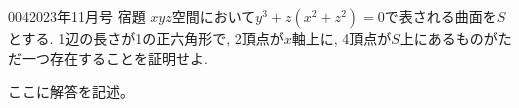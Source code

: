 \begin{prob}{004}{}{2023年11月号 宿題}
 $xyz$空間において$y^3 + z(x^2 + z^2)=0$で表される曲面を$S$とする. 1辺の長さが1の正六角形で, 2頂点が$x$軸上に, 4頂点が$S$上にあるものがただ一つ存在することを証明せよ.
\end{prob}

ここに解答を記述。
